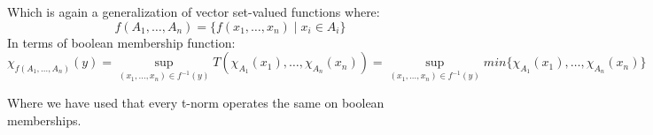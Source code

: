 Which is again a generalization of vector set-valued functions where: $$f(A_1,\ldots,A_n)= \{f(x_1,\ldots,x_n)\mid x_i\in A_i\}$$
In terms of boolean membership function:
$$\chi _{f(A_1,\ldots,A_n)}(y)=\sup_{(x_1,\ldots,x_n)\in f^{-1}(y)}T(\chi_{A_1}(x_1),\ldots,\chi_{A_n}(x_n)) = \sup_{(x_1,\ldots,x_n)\in f^{-1}(y)}min\{\chi_{A_1}(x_1),\ldots,\chi_{A_n}(x_n)\}$$

Where we have used that every t-norm operates the same on boolean memberships. \\

